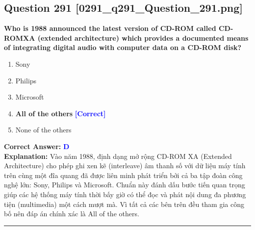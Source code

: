 \documentclass[11pt,a4paper]{article}
\begin{document}
\begin{minipage}{\textwidth}
\subsection*{Question 291 \quad \footnotesize{[0291\_q291\_Question\_291.png]}}
\noindent \textbf{Who is 1988 announced the latest version of CD-ROM called CD-ROMXA (extended architecture) which provides a documented means of integrating digital audio with computer data on a CD-ROM disk?}

\begin{enumerate}[label=\Alph*.]
    \item Sony
    \item Philips
    \item Microsoft
    \item \textbf{All of the others} \hfill \textcolor{blue}{\textbf{[Correct]}}
    \item None of the others
\end{enumerate}

\noindent \textbf{Correct Answer:} \textcolor{blue}{\textbf{D}} \\[2pt]
\noindent \textbf{Explanation:} Vào năm 1988, định dạng mở rộng CD-ROM XA (Extended Architecture) cho phép ghi xen kẽ (interleave) âm thanh số với dữ liệu máy tính trên cùng một đĩa quang đã được liên minh phát triển bởi cả ba tập đoàn công nghệ lớn: Sony, Philips và Microsoft. Chuẩn này đánh dấu bước tiến quan trọng giúp các hệ thống máy tính thời bấy giờ có thể đọc và phát nội dung đa phương tiện (multimedia) một cách mượt mà. Vì tất cả các bên trên đều tham gia công bố nên đáp án chính xác là All of the others.

\par\vspace{0.3cm}
\hrule
\vspace{0.3cm}
\end{minipage}
\end{document}
